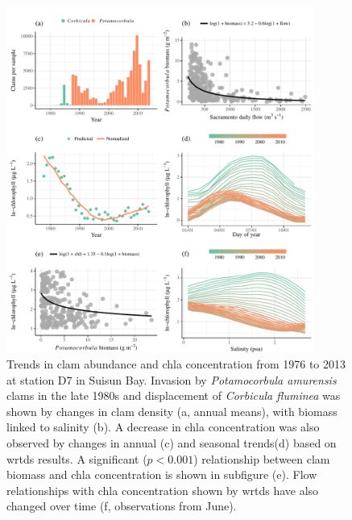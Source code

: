 \documentclass[journal = esthag, manuscript = article]{achemso}\usepackage[]{graphicx}\usepackage[]{color}
\begin{document}
\begin{figure}[!ht]

{\centering \includegraphics[width=0.9\textwidth]{figs/clmchl-1} 

}

\caption{Trends in clam abundance and \ac{chla} concentration from 1976 to 2013 at station D7 in Suisun Bay.  Invasion by \textit{Potamocorbula amurensis} clams in the late 1980s and displacement of \textit{Corbicula fluminea} was shown by changes in clam density (a, annual means), with biomass linked to salinity (b).  A decrease in \ac{chla} concentration was also observed by changes in annual (c) and seasonal trends(d) based on \ac{wrtds} results.  A significant ($p < 0.001$) relationship between clam biomass and \ac{chla} concentration is shown in subfigure (e).  Flow relationships with \ac{chla} concentration shown by \ac{wrtds} have also changed over time (f, observations from June).}\label{fig:clmchl}
\end{figure}



\clearpage
\end{document}
